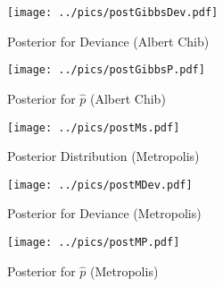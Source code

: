 \documentclass{article}
\def\beginmyfig{\begin{figure}[htbp]\begin{center}}
\def\endmyfig{\end{center}\end{figure}}
\begin{document}
\beginmyfig
  \caption{Posterior for Deviance (Albert Chib)}
  \texttt{[image: ../pics/postGibbsDev.pdf]}
\endmyfig

\beginmyfig
  \caption{Posterior for $\hat{p}$ (Albert Chib)}
  \texttt{[image: ../pics/postGibbsP.pdf]}
\endmyfig

\beginmyfig
  \caption{Posterior Distribution (Metropolis)}
  \texttt{[image: ../pics/postMs.pdf]}
\endmyfig

\beginmyfig
  \caption{Posterior for Deviance (Metropolis)}
  \texttt{[image: ../pics/postMDev.pdf]}
\endmyfig

\beginmyfig
  \caption{Posterior for $\hat{p}$ (Metropolis)}
  \texttt{[image: ../pics/postMP.pdf]}
\endmyfig
\end{document}
